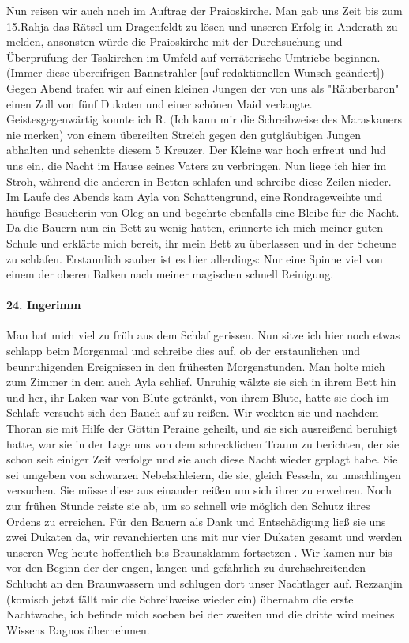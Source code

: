 \documentclass[11pt]{scrreprt}
\begin{document}
Nun reisen wir auch noch im Auftrag der Praioskirche. Man gab uns Zeit bis zum 15.Rahja das Rätsel um Dragenfeldt  zu lösen und unseren Erfolg in Anderath zu melden, ansonsten würde die Praioskirche mit der Durchsuchung und Überprüfung der Tsakirchen im Umfeld auf verräterische Umtriebe beginnen. (Immer diese übereifrigen Bannstrahler [auf redaktionellen Wunsch geändert]) Gegen Abend trafen wir auf einen kleinen Jungen der von uns als "Räuberbaron" einen Zoll von fünf Dukaten und einer schönen Maid verlangte. Geistesgegenwärtig konnte ich R. (Ich kann mir die Schreibweise des Maraskaners nie merken) von einem übereilten Streich gegen den gutgläubigen Jungen abhalten und schenkte diesem 5 Kreuzer. Der Kleine war hoch erfreut und lud uns ein, die Nacht im Hause seines Vaters zu verbringen. Nun liege ich hier im Stroh, während die anderen in Betten schlafen und schreibe diese Zeilen nieder. Im Laufe des Abends kam Ayla von Schattengrund, eine Rondrageweihte und häufige Besucherin von Oleg an und begehrte ebenfalls eine Bleibe für die Nacht. Da die Bauern nun ein Bett zu wenig hatten, erinnerte ich mich meiner guten Schule und erklärte mich bereit, ihr mein Bett zu überlassen und in der Scheune zu schlafen. Erstaunlich sauber ist es hier allerdings: Nur eine Spinne viel von einem der oberen Balken nach meiner magischen schnell Reinigung.

\paragraph{24. Ingerimm}

Man hat mich viel zu früh aus dem Schlaf gerissen. Nun sitze ich hier noch etwas schlapp beim Morgenmal und schreibe dies auf, ob der erstaunlichen und beunruhigenden Ereignissen in den frühesten Morgenstunden. Man holte mich zum Zimmer in dem auch Ayla schlief. Unruhig wälzte sie sich in ihrem Bett hin und her, ihr Laken war von Blute getränkt, von ihrem Blute, hatte sie doch im Schlafe versucht sich den Bauch auf zu reißen. Wir weckten sie und nachdem Thoran sie mit Hilfe der Göttin Peraine geheilt, und sie sich ausreißend beruhigt hatte, war sie in der Lage uns von dem schrecklichen Traum zu berichten, der sie schon seit einiger Zeit verfolge und sie auch diese Nacht wieder geplagt habe. Sie sei umgeben von schwarzen Nebelschleiern, die sie, gleich Fesseln, zu umschlingen versuchen. Sie müsse diese aus einander reißen um sich ihrer zu erwehren. Noch zur frühen Stunde reiste sie ab, um so schnell wie möglich den Schutz ihres Ordens zu erreichen. Für den Bauern als Dank und Entschädigung ließ sie uns zwei Dukaten da, wir revanchierten uns mit nur vier Dukaten gesamt und werden unseren Weg heute hoffentlich bis Braunsklamm fortsetzen .
Wir kamen nur bis vor den Beginn der der engen, langen und gefährlich zu durchschreitenden Schlucht an den Braunwassern und schlugen dort unser Nachtlager auf. Rezzanjin (komisch jetzt fällt mir die Schreibweise wieder ein) übernahm die erste Nachtwache, ich befinde mich soeben bei der zweiten und die dritte wird meines Wissens Ragnos übernehmen.
\end{document}
